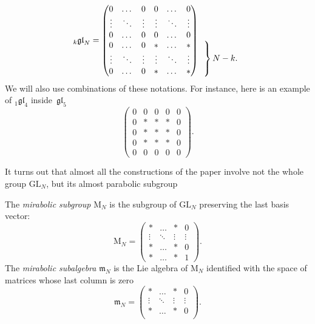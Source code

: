 \documentclass[10pt,a4paper]{article}
\numberwithin{equation}{section}
\newcommand{\GL}{\mathrm{GL}}
\newcommand{\rM}{\mathrm{M}}
\newcommand{\m}{\mathfrak{m}}
\newcommand{\gl}{\mathfrak{gl}}
\begin{document}
	\[
	{}_k \gl_N = \begin{pmatrix}
		0 & \dots & 0 & 0 & \dots & 0 \\
		\vdots & \ddots & \vdots & \vdots & \ddots & \vdots \\
		0 & \dots & 0 & 0 & \dots & 0 \\
		0 & \dots & 0 & * & \dots & * \\
		\vdots & \ddots & \vdots & \vdots & \ddots & \vdots \\
		0 & \dots & 0 & * & \dots & *
	\end{pmatrix}
	\begin{array}{ c }
		\vphantom{\begin{array}{ c }
				b_N \\ %
				\vdots \\ %
				z_N %
		\end{array}} \\
		\left.\kern-\nulldelimiterspace
		\vphantom{\begin{array}{ c }
				b_N \\ %
				\vdots \\ %
				z_N %
		\end{array}}
		\right\}\text{$N-k$.}
	\end{array}
	\]
	We will also use combinations of these notations. For instance, here is an example of $ {}_1 \gl_4$ inside~$\gl_5$
	\[
	\begin{pmatrix}
		0 & 0 & 0 & 0 & 0 \\
		0 & * & * & * & 0 \\
		0 & * & * & * & 0 \\
		0 & * & * & * & 0 \\
		0& 0 & 0 & 0 & 0
	\end{pmatrix}.
	\]
	
	It turns out that almost all the constructions of the paper involve not the whole group $\GL_N$, but its almost parabolic subgroup
	\begin{Definition}
		The \emph{mirabolic subgroup} $\rM_N$ is the subgroup of $\GL_N$ preserving the last basis vector:
		\[
		\rM_N = \begin{pmatrix}
			* & \dots & * & 0 \\
			\vdots & \ddots & \vdots & \vdots \\
			* & \dots & * & 0 \\
			* & \dots & * & 1
		\end{pmatrix}.
		\]
		The \emph{mirabolic subalgebra} $\m_N$ is the Lie algebra of $\rM_N$ identified with the space of matrices whose last column is zero
		\[
		\m_N = \begin{pmatrix}
			* & \dots & * & 0 \\
			\vdots & \ddots & \vdots & \vdots \\
			* & \dots & * & 0 \\
		\end{pmatrix}.
		\]
	\end{Definition}
	
\end{document}
